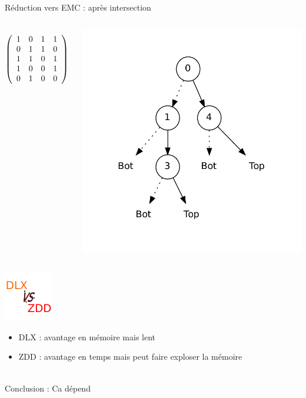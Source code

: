\documentclass{beamer}
\begin{document}
\begin{frame}{Réduction vers EMC : après intersection}
  \begin{columns}

  \begin{displaymath}
   \left(\begin{array}{ c c c c c }
   1 & 0 & 1 & 1 \\
   0 & 1 & 1 & 0 \\
   1 & 1 & 0 & 1 \\
   1 & 0 & 0 & 1 \\
   0 & 1 & 0 & 0
  \end{array}\right)
  \end{displaymath}

    \includegraphics[height=0.8\textheight]{../imports/inter.pdf}
  \end{columns}
\end{frame}

\begin{frame}{}
\begin{center}
    \includegraphics[height=0.5\textheight]{../imports/vs.pdf}
\end{center}
\begin{itemize}
\item DLX : avantage en mémoire mais lent
\item ZDD : avantage en temps mais peut faire exploser la mémoire \\
\end{itemize}
~\\
Conclusion : Ca dépend
\end{frame}
\end{document}
